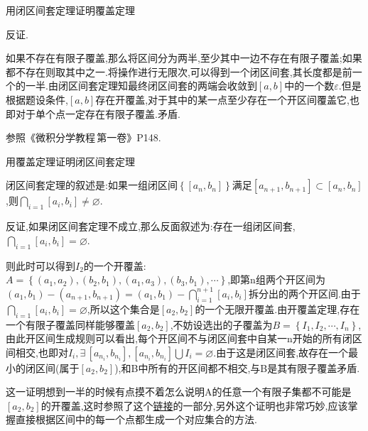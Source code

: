      \begin{exercise}
         用闭区间套定理证明覆盖定理
     \end{exercise}
     \begin{solution}
         反证.

         如果不存在有限子覆盖,那么将区间分为两半,至少其中一边不存在有限子覆盖;如果都不存在则取其中之一.将操作进行无限次,可以得到一个闭区间套,其长度都是前一个的一半.由闭区间套定理知最终闭区间套的两端会收敛到$\left[ a,b \right]$中的一个数$\varepsilon$.但是根据题设条件,$\left[ a,b \right]$存在开覆盖,对于其中的某一点至少存在一个开区间覆盖它,也即对于单个点一定存在有限子覆盖.矛盾.
     \end{solution}
     \begin{note}
         参照《微积分学教程\,第一卷》P148.
     \end{note}

     \begin{exercise}
         用覆盖定理证明闭区间套定理
     \end{exercise}
     \begin{solution}
         闭区间套定理的叙述是:如果一组闭区间$\left\{ \left[a_n,b_n\right] \right\}$满足$\left[a_{n+1},b_{n+1}\right]\subset \left[a_n,b_n\right]$,则$\bigcap_{i=1}\left[a_i,b_i\right]\neq \varnothing $.

         反证,如果闭区间套定理不成立,那么反面叙述为:存在一组闭区间套,$\bigcap_{i=1}\left[a_i,b_i\right]= \varnothing $.

         则此时可以得到$I_2$的一个开覆盖:$A=\left\{\left(a_1,a_2\right),\left(b_2,b_1\right),\left(a_1,a_3\right),\left(b_3,b_1\right),\cdots\right\}$,即第n组两个开区间为$\left(a_1,b_1\right)-\left(a_{n+1},b_{n+1}\right)=\left(a_1,b_1\right)-\bigcap_{i=1}^{n+1}\left[a_i,b_i\right]$拆分出的两个开区间.由于$\bigcap_{i=1}\left[a_i,b_i\right]= \varnothing $,所以这个集合是$\left[a_2,b_2\right]$的一个无限开覆盖.由开覆盖定理,存在一个有限子覆盖同样能够覆盖$\left[a_2,b_2\right]$,不妨设选出的子覆盖为$B=\left\{I_1,I_2,\cdots,I_n\right\}$,由此开区间生成规则可以看出,每个开区间不与闭区间套中自某一n开始的所有闭区间相交,也即对$I_i,\exists\, \left[a_{n_i},b_{n_i}\right],\left[a_{n_i},b_{n_i}\right]\textstyle\bigcup I_i=\varnothing$.由于这是闭区间套,故存在一个最小的闭区间(属于$\left[a_2,b_2\right]$),和B中所有的开区间都不相交,与B是其有限子覆盖矛盾.
     \end{solution}
     \begin{note}
         这一证明想到一半的时候有点摸不着怎么说明A的任意一个有限子集都不可能是$[a_2,b_2]$的开覆盖,这时参照了这个\href{https://blog.csdn.net/qq_45481282/article/details/107568842}{链接}的一部分,另外这个证明也非常巧妙,应该掌握直接根据区间中的每一个点都生成一个对应集合的方法.
     \end{note}

